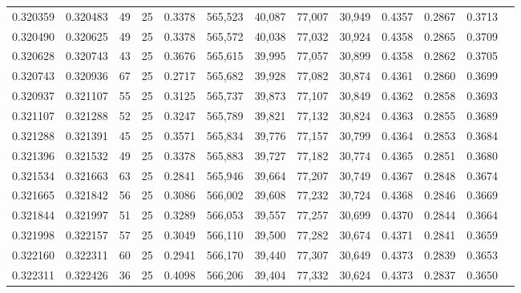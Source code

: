 \begin{tabular}{rrrrrrrrrrrrr}
0.320359 & 0.320483 &    49 &  25 &                                     0.3378 & 565,523 &  40,087 &  77,007 &  30,949 & 0.4357 & 0.2867 & 0.3713 \\
0.320490 & 0.320625 &    49 &  25 &                                     0.3378 & 565,572 &  40,038 &  77,032 &  30,924 & 0.4358 & 0.2865 & 0.3709 \\
0.320628 & 0.320743 &    43 &  25 &                                     0.3676 & 565,615 &  39,995 &  77,057 &  30,899 & 0.4358 & 0.2862 & 0.3705 \\
0.320743 & 0.320936 &    67 &  25 &                                     0.2717 & 565,682 &  39,928 &  77,082 &  30,874 & 0.4361 & 0.2860 & 0.3699 \\
0.320937 & 0.321107 &    55 &  25 &                                     0.3125 & 565,737 &  39,873 &  77,107 &  30,849 & 0.4362 & 0.2858 & 0.3693 \\
0.321107 & 0.321288 &    52 &  25 &                                     0.3247 & 565,789 &  39,821 &  77,132 &  30,824 & 0.4363 & 0.2855 & 0.3689 \\
0.321288 & 0.321391 &    45 &  25 &                                     0.3571 & 565,834 &  39,776 &  77,157 &  30,799 & 0.4364 & 0.2853 & 0.3684 \\
0.321396 & 0.321532 &    49 &  25 &                                     0.3378 & 565,883 &  39,727 &  77,182 &  30,774 & 0.4365 & 0.2851 & 0.3680 \\
0.321534 & 0.321663 &    63 &  25 &                                     0.2841 & 565,946 &  39,664 &  77,207 &  30,749 & 0.4367 & 0.2848 & 0.3674 \\
0.321665 & 0.321842 &    56 &  25 &                                     0.3086 & 566,002 &  39,608 &  77,232 &  30,724 & 0.4368 & 0.2846 & 0.3669 \\
0.321844 & 0.321997 &    51 &  25 &                                     0.3289 & 566,053 &  39,557 &  77,257 &  30,699 & 0.4370 & 0.2844 & 0.3664 \\
0.321998 & 0.322157 &    57 &  25 &                                     0.3049 & 566,110 &  39,500 &  77,282 &  30,674 & 0.4371 & 0.2841 & 0.3659 \\
0.322160 & 0.322311 &    60 &  25 &                                     0.2941 & 566,170 &  39,440 &  77,307 &  30,649 & 0.4373 & 0.2839 & 0.3653 \\
0.322311 & 0.322426 &    36 &  25 &                                     0.4098 & 566,206 &  39,404 &  77,332 &  30,624 & 0.4373 & 0.2837 & 0.3650 \\

\end{tabular}
